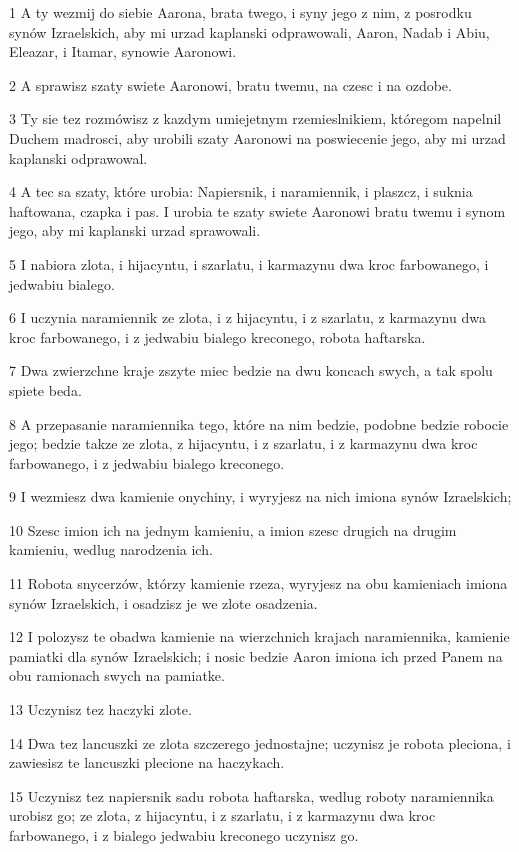 \par 1 A ty wezmij do siebie Aarona, brata twego, i syny jego z nim, z posrodku synów Izraelskich, aby mi urzad kaplanski odprawowali, Aaron, Nadab i Abiu, Eleazar, i Itamar, synowie Aaronowi.
\par 2 A sprawisz szaty swiete Aaronowi, bratu twemu, na czesc i na ozdobe.
\par 3 Ty sie tez rozmówisz z kazdym umiejetnym rzemieslnikiem, któregom napelnil Duchem madrosci, aby urobili szaty Aaronowi na poswiecenie jego, aby mi urzad kaplanski odprawowal.
\par 4 A tec sa szaty, które urobia: Napiersnik, i naramiennik, i plaszcz, i suknia haftowana, czapka i pas. I urobia te szaty swiete Aaronowi bratu twemu i synom jego, aby mi kaplanski urzad sprawowali.
\par 5 I nabiora zlota, i hijacyntu, i szarlatu, i karmazynu dwa kroc farbowanego, i jedwabiu bialego.
\par 6 I uczynia naramiennik ze zlota, i z hijacyntu, i z szarlatu, z karmazynu dwa kroc farbowanego, i z jedwabiu bialego kreconego, robota haftarska.
\par 7 Dwa zwierzchne kraje zszyte miec bedzie na dwu koncach swych, a tak spolu spiete beda.
\par 8 A przepasanie naramiennika tego, które na nim bedzie, podobne bedzie robocie jego; bedzie takze ze zlota, z hijacyntu, i z szarlatu, i z karmazynu dwa kroc farbowanego, i z jedwabiu bialego kreconego.
\par 9 I wezmiesz dwa kamienie onychiny, i wyryjesz na nich imiona synów Izraelskich;
\par 10 Szesc imion ich na jednym kamieniu, a imion szesc drugich na drugim kamieniu, wedlug narodzenia ich.
\par 11 Robota snycerzów, którzy kamienie rzeza, wyryjesz na obu kamieniach imiona synów Izraelskich, i osadzisz je we zlote osadzenia.
\par 12 I polozysz te obadwa kamienie na wierzchnich krajach naramiennika, kamienie pamiatki dla synów Izraelskich; i nosic bedzie Aaron imiona ich przed Panem na obu ramionach swych na pamiatke.
\par 13 Uczynisz tez haczyki zlote.
\par 14 Dwa tez lancuszki ze zlota szczerego jednostajne; uczynisz je robota pleciona, i zawiesisz te lancuszki plecione na haczykach.
\par 15 Uczynisz tez napiersnik sadu robota haftarska, wedlug roboty naramiennika urobisz go; ze zlota, z hijacyntu, i z szarlatu, i z karmazynu dwa kroc farbowanego, i z bialego jedwabiu kreconego uczynisz go.
